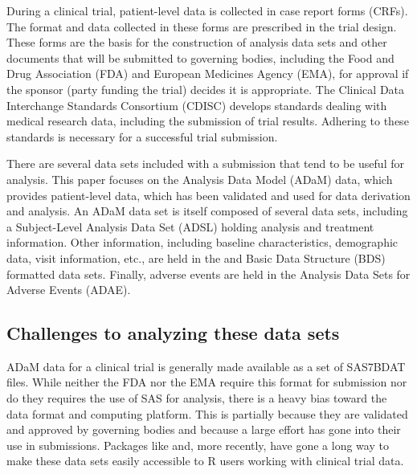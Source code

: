 During a clinical trial, patient-level data is collected in case report
forms (CRFs). The format and data collected in these forms are
prescribed in the trial design. These forms are the basis for the
construction of analysis data sets and other documents that will be
submitted to governing bodies, including the Food and Drug Association
(FDA) and European Medicines Agency (EMA), for approval if the sponsor
(party funding the trial) decides it is appropriate. The Clinical Data
Interchange Standards Consortium (CDISC) \citep{CDISC} develops
standards dealing with medical research data, including the submission
of trial results. Adhering to these standards is necessary for a
successful trial submission.

There are several data sets included with a submission that tend to be
useful for analysis. This paper focuses on the Analysis Data Model
(ADaM) data, which provides patient-level data, which has been validated
and used for data derivation and analysis. An ADaM data set is itself
composed of several data sets, including a Subject-Level Analysis Data
Set (ADSL) holding analysis and treatment information. Other
information, including baseline characteristics, demographic data, visit
information, etc., are held in the and Basic Data Structure (BDS)
formatted data sets. Finally, adverse events are held in the Analysis
Data Sets for Adverse Events (ADAE).

\hypertarget{challenges-to-analyzing-these-data-sets}{%
\subsection{Challenges to analyzing these data
sets}\label{challenges-to-analyzing-these-data-sets}}

ADaM data for a clinical trial is generally made available as a set of
SAS7BDAT \citep{sas7bdat} files. While neither the FDA nor the EMA
require this format for submission nor do they requires the use of SAS
\citep{sas} for analysis, there is a heavy bias toward the data format
and computing platform. This is partially because they are validated and
approved by governing bodies and because a large effort has gone into
their use in submissions. Packages like  \citep{sasbdat}
and, more recently,  \citep{haven} have gone a long way to
make these data sets easily accessible to R \citep{R} users working with
clinical trial data.

